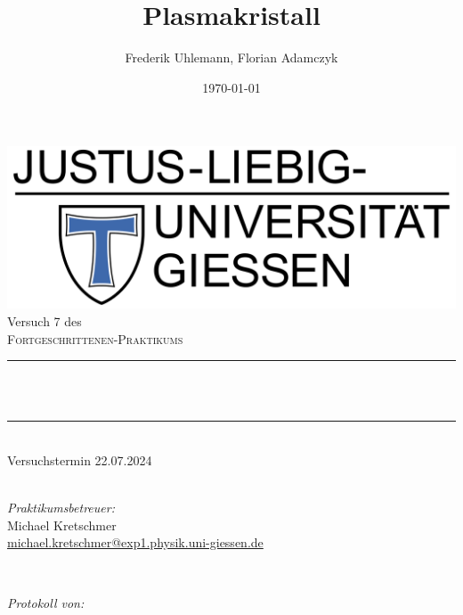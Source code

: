 \documentclass[12pt,a4paper,ngerman]{report}
\title{Plasmakristall} %
\author{Frederik Uhlemann, Florian Adamczyk}
\date{\today}
\makeatletter
\let\thetitle\@title
\makeatother
\begin{document}
		
	
	\begin{titlepage}
		\centering
		\vspace*{0.5 cm}
		\includegraphics[width = 0.6 \textwidth]{JLU_Giessen-Logo}	%
		\\[2.0 cm]
		Versuch 7 des\\
		\textsc{\Large Fortgeschrittenen-Praktikums}\\ [0.3 cm]				%
		\rule{\linewidth}{0.2 mm} \\[0.4 cm]
		{ \huge \bfseries \thetitle}\\
		\rule{\linewidth}{0.2 mm}\\
		Versuchstermin 22.07.2024 \\
		~ \\
		[2.0 cm]
		
		
		\begin{minipage}{0.49\textwidth}
			\begin{flushleft}
				 \emph{Praktikumsbetreuer:}\\
				 Michael Kretschmer\\
				 \small{\href{mailto:michael.kretschmer@exp1.physik.uni-giessen.de}{michael.kretschmer@exp1.physik.uni-giessen.de}}
			\end{flushleft}
		\end{minipage}~
		\begin{minipage}{0.49\textwidth}
			\begin{flushright}
				\emph{Protokoll von:} \\
				

\end{flushright}
\end{minipage}
\end{titlepage}
\end{document}
